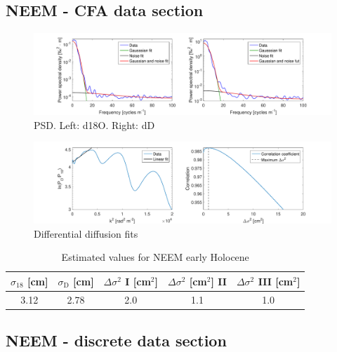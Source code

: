 \documentclass[11pt, draftcls, onecolumn]{IEEEtran} %
\numberwithin{equation}{section}
\numberwithin{table}{section}
\numberwithin{figure}{section}
\begin{document}
\begin{appendices}
\subsection{NEEM - CFA data section}

\begin{figure}[H]
	\vspace*{2mm}
	\begin{center}
		\includegraphics[width=1\textwidth]{Figure_25}
		\caption{PSD. Left: d18O. Right: dD}  \label{fig:NEEM_cfa_fig_1}
	\end{center}
\end{figure}

\begin{figure}[H]
	\vspace*{2mm}
	\begin{center}
		\includegraphics[width=1\textwidth]{Figure_26}
		\caption{Differential diffusion fits}  \label{fig:NEEM_cfa_fig_2}
	\end{center}
\end{figure}

\begin{table}[H]
	\center
	\caption{Estimated values for NEEM early Holocene}
	\label{NEEM_cfa_tbl}
	\begin{tabular}{c c c c c} 
		\toprule
		$\sigma_{18}$ [cm] & $\sigma_\mathrm{D}$ [cm] & $\Delta\sigma^2$ I [cm$^2$] & $\Delta\sigma^2$ [cm$^2$] II & $\Delta\sigma^2$ III [cm$^2$] \\
		\midrule
	  3.12 &   2.78 &     2.0 &     1.1 &     1.0 \\

		\bottomrule		
	\end{tabular}
\end{table}
\clearpage
\subsection{NEEM - discrete data section}


\end{appendices}
\end{document}
